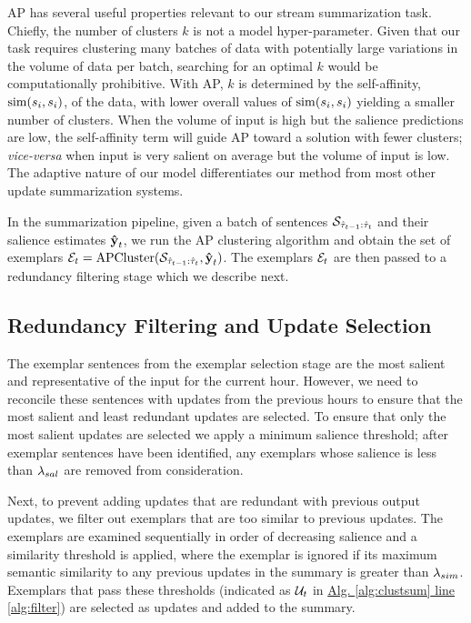 AP has several useful properties relevant to our stream summarization task.
Chiefly, the number of clusters $k$ is not a model hyper-parameter. Given that
our task requires clustering many batches of data with potentially large
variations in the volume of data per batch, searching for an optimal $k$ would
be computationally prohibitive. With AP, $k$ is determined by the
self-affinity, $\operatorname{sim}(s_i,s_i)$, of the data,  with lower overall
values of $\operatorname{sim}(s_i,s_i)$ yielding a smaller number of clusters.
When the volume of input is high but the salience predictions are low, the
self-affinity term will guide AP toward a solution with fewer clusters;
\textit{vice-versa} when input is very salient on average but the volume of
input is low. The adaptive nature of our model differentiates our method from
most other update summarization systems.

In the summarization pipeline, given a batch of sentences
$\mathcal{S}_{\hat{\tau}_{{t-1}}:\hat{\tau}_t}$ and their salience estimates
$\boldsymbol{\hat{\mathbf{y}}}_t$, we run the AP clustering algorithm and obtain the set of
exemplars $\mathcal{E}_t = \operatorname{APCluster}(\mathcal{S}_{\hat{\tau}_{{t-1}}:\hat{\tau}_t},
\boldsymbol{\hat{\mathbf{y}}}_t)$. The exemplars $\mathcal{E}_t$ are then passed to a redundancy
filtering stage which we describe next.

\subsection{{Redundancy Filtering and Update Selection}}
\label{sec:upsel}

The exemplar sentences from the exemplar selection stage are the most salient
and representative of the input for the current hour. However, we need to
reconcile these sentences with updates from the previous hours to ensure that
the most salient and least redundant  updates are selected. To ensure that only
the most salient updates are selected we apply a minimum salience threshold;
after exemplar sentences have been identified, any exemplars whose salience is
less than ${\lambda_{sal}}$ are removed from consideration. 

Next, to prevent adding updates that are redundant with previous output
updates, we filter out exemplars that are too similar to previous updates.  The
exemplars are examined sequentially in order of decreasing salience and  a
similarity threshold is applied, where the exemplar is ignored if its maximum
semantic similarity to any previous updates in the summary is greater than
${\lambda_{sim}}$.  Exemplars that pass these thresholds (indicated as
$\mathcal{U}_t$ in \hyperref[alg:clustsum]{Alg. \ref{alg:clustsum} line
\ref{alg:filter}}) are selected as updates and added to the summary.

